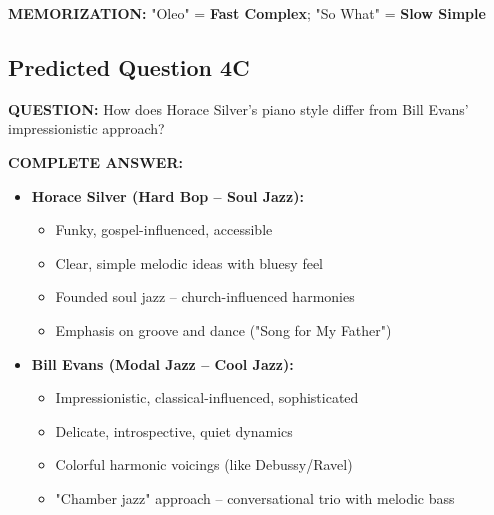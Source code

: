 \documentclass[11pt]{article}
\begin{document}
\textbf{MEMORIZATION:} "Oleo" = \textbf{Fast Complex}; "So What" = \textbf{Slow Simple}

\subsection*{Predicted Question 4C}

\begin{mdframed}[backgroundcolor=questioncolor!10, linewidth=2pt]
\textbf{\textcolor{questioncolor}{QUESTION:}} How does Horace Silver's piano style differ from Bill Evans' impressionistic approach?
\end{mdframed}

\begin{mdframed}[backgroundcolor=answercolor!10, linewidth=2pt]
\textbf{\textcolor{answercolor}{COMPLETE ANSWER:}}

\begin{itemize}[leftmargin=*, nosep]
    \item \textbf{Horace Silver (Hard Bop – Soul Jazz):}
    \begin{itemize}[nosep]
        \item Funky, gospel-influenced, accessible
        \item Clear, simple melodic ideas with bluesy feel
        \item Founded soul jazz – church-influenced harmonies
        \item Emphasis on groove and dance ("Song for My Father")
    \end{itemize}
    
    \item \textbf{Bill Evans (Modal Jazz – Cool Jazz):}
    \begin{itemize}[nosep]
        \item Impressionistic, classical-influenced, sophisticated
        \item Delicate, introspective, quiet dynamics
        \item Colorful harmonic voicings (like Debussy/Ravel)
        \item "Chamber jazz" approach – conversational trio with melodic bass
    \end{itemize}
\end{itemize}

\vspace{5pt}
\end{mdframed}
\end{document}
